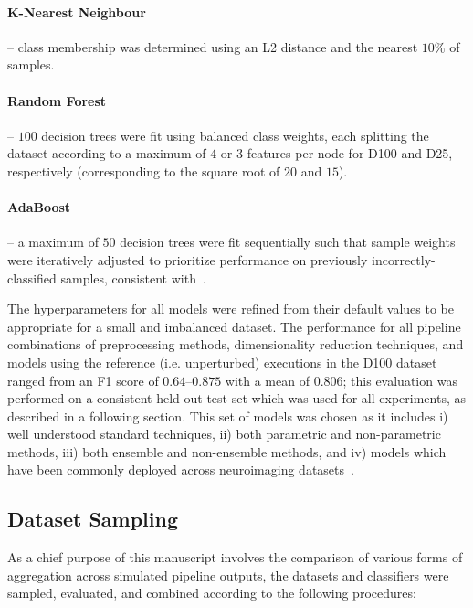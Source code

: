 \documentclass[fleqn,10pt]{SelfArx} %
\begin{document}
\paragraph{K-Nearest Neighbour} – class membership was determined using an L2 distance and the nearest $10\%$ of
samples.

\paragraph{Random Forest} – $100$ decision trees were fit using balanced class weights, each splitting the dataset
according to a maximum of $4$ or $3$ features per node for D100 and D25, respectively (corresponding to the square root
of $20$ and $15$).

\paragraph{AdaBoost} – a maximum of $50$ decision trees were fit sequentially such that sample weights were iteratively
adjusted to prioritize performance on previously incorrectly-classified samples, consistent with~\cite{Freund1997-qy}.

The hyperparameters for all models were refined from their default values to be appropriate for a small and imbalanced
dataset. The performance for all pipeline combinations of preprocessing methods, dimensionality reduction techniques,
and models using the reference (i.e. unperturbed) executions in the D100 dataset ranged from an F1 score of
$0.64 – 0.875$ with a mean of $0.806$; this evaluation was performed on a consistent held-out test set which was used
for all experiments, as described in a following section. This set of models was chosen as it includes i) well
understood standard techniques, ii) both parametric and non-parametric methods, iii) both ensemble and non-ensemble
methods, and iv) models which have been commonly deployed across neuroimaging datasets~\cite{Meier2012-ve,Tunc2016-cz,
Zhu2018-cs,Payabvash2019-tm,Crossley2014-tg,Park2015-uj,Nayak2016-wl,Tolan2018-nq}.

\subsection*{Dataset Sampling}

As a chief purpose of this manuscript involves the comparison of various forms of aggregation across simulated pipeline
outputs, the datasets and classifiers were sampled, evaluated, and combined according to the following procedures:
\end{document}

